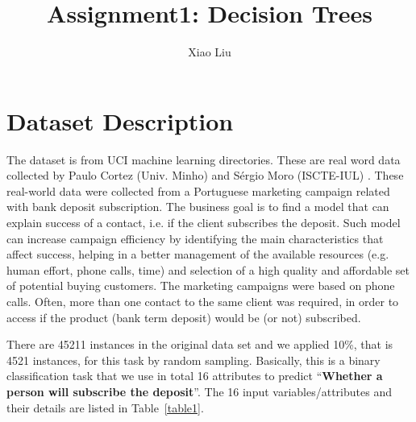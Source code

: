 \documentclass[letter]{article}
\title{Assignment1: Decision Trees}
\author{Xiao Liu}
\begin{document}
\maketitle
\section{Dataset Description}
The dataset is from UCI machine learning directories. These are real word 
data collected by Paulo Cortez (Univ. Minho) and Sérgio Moro (ISCTE-IUL) 
\cite{moro2011using}. These real-world data were collected from a Portuguese
marketing campaign related with bank deposit subscription. The business goal
is to find a model that can explain success of a contact, i.e. if the client
subscribes the deposit. Such model can increase campaign efficiency by
identifying the main characteristics that affect success, helping in a 
better management of the available resources (e.g. human effort, phone 
calls, time) and selection of a high quality and affordable set of potential
buying customers. The marketing campaigns were based on phone calls. Often, 
more than one contact to the same client was required, in order to access if 
the product (bank term deposit) would be (or not) subscribed. 

There are 45211 instances in the original data set and we applied 10\%, that
is 4521 instances, for this task by random sampling. Basically, this is a 
binary classification task that we use in total 16 attributes to predict 
``{\bf Whether a person will subscribe the deposit}''. The 16 input 
variables/attributes and their details are listed in Table~\ref{table1}.
\end{document}
